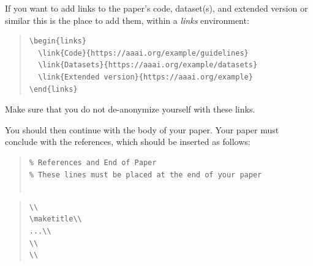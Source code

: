 \noindent If you want to add links to the paper's code, dataset(s), and
extended version or similar this is the place to add them, within a
\emph{links} environment:

\begin{quote}%
\begin{scriptsize}\begin{verbatim}
\begin{links}
  \link{Code}{https://aaai.org/example/guidelines}
  \link{Datasets}{https://aaai.org/example/datasets}
  \link{Extended version}{https://aaai.org/example}
\end{links}\end{verbatim}\end{scriptsize}
\end{quote}

\noindent Make sure that you do not de-anonymize yourself with these
links.

\noindent You should then continue with the body of your paper. Your
paper must conclude with the references, which should be inserted as
follows:

\begin{quote}
\begin{scriptsize}\begin{verbatim}
% References and End of Paper
% These lines must be placed at the end of your paper


\end{verbatim}\end{scriptsize}
\end{quote}

\begin{quote}
\begin{scriptsize}\begin{verbatim}
\\
\maketitle\\
...\\
\\
\\
\end{verbatim}\end{scriptsize}
\end{quote}

